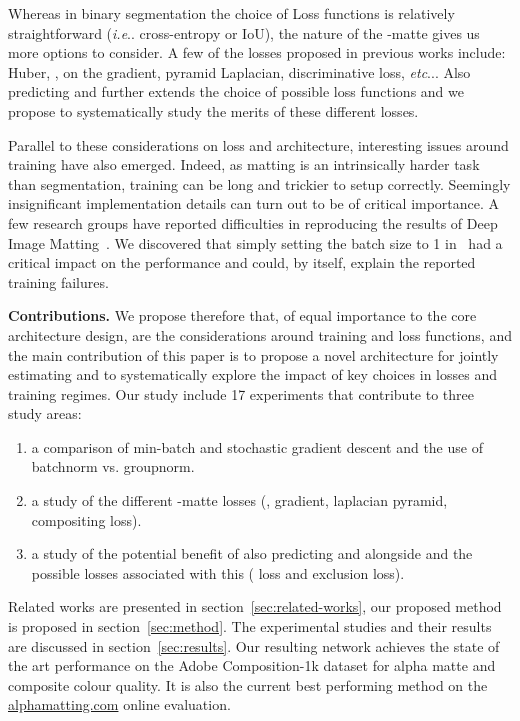 \documentclass[runningheads]{llncs}
\makeatletter
\DeclareRobustCommand\onedot{\futurelet\@let@token\@onedot}
\def\@onedot{\ifx\@let@token.\else.\null\fi\xspace}
\def\ie{\emph{i.e}\onedot} \def\Ie{\emph{I.e}\onedot}
\def\etc{\emph{etc}\onedot} \def\vs{\emph{vs}\onedot}
\makeatother
\begin{document}
Whereas in binary segmentation the choice of Loss functions is relatively straightforward (\ie
cross-entropy or IoU), the nature of the -matte gives us more options to consider. A few of the  losses proposed in previous
works include: Huber, ,  on the gradient, pyramid Laplacian,
discriminative loss, \etc. Also predicting  and  further extends the
choice of possible loss functions and we propose to systematically study the
merits of these different losses.

Parallel to these considerations on loss and architecture, interesting issues
around training have also emerged. Indeed, as matting is an intrinsically harder
task than segmentation, training can be long and trickier to setup
correctly. Seemingly insignificant implementation details can turn out to be of
critical importance. A few research groups have reported difficulties in
reproducing the results of Deep Image Matting~\cite{foamliu_2020,AlphaGAN,joker316701882_2018}. We discovered that
simply setting the batch size to 1 in~\cite{DeepImageMatting} had a critical impact on the
performance and could, by itself, explain the reported training failures.

{\bf Contributions.} We propose therefore that, of equal importance to the core
architecture design, are the considerations around training and loss functions, and
the main contribution of this paper is to propose a novel architecture for
jointly estimating  and to systematically explore the impact of
key choices in losses and training regimes. Our study include 17 experiments
that contribute to three study areas:
\begin{enumerate}
    \item a comparison of min-batch and stochastic gradient descent and the use
      of batchnorm vs. groupnorm.
    \item a study of the different -matte losses (, gradient,
      laplacian pyramid, compositing loss).
    \item a study of the potential benefit of also predicting  and 
      alongside  and the possible losses associated with this (
      loss and exclusion loss).
\end{enumerate}

Related works are presented in section~\ref{sec:related-works}, our proposed method is proposed in section~\ref{sec:method}. The experimental studies and their results are discussed in section~\ref{sec:results}. Our resulting network achieves
the state of the art performance on the Adobe Com\-po\-si\-tion-1k dataset for
alpha matte and composite colour quality. It is also the current best performing
method on the \url{alphamatting.com} online evaluation.
\end{document}
